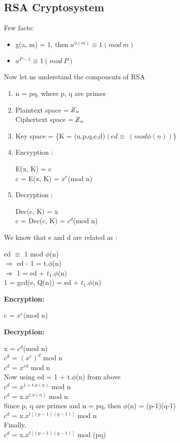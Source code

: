 \documentclass[11pt]{article}
\newcommand{\zbar}{\raisebox{0.2ex}{--}\kern-0.6em Z}
\begin{document}
\subsection{RSA Cryptosystem}
Few facts:
\begin{itemize}
    \item g(a, m) = 1, then $a^{\phi(m)} \equiv 1 (mod\ m)$
    \item $a^{P-1} \equiv 1 (mod \ P)$
\end{itemize}
Now let us understand the components of RSA
\begin{enumerate}
    \item n = pq, where p, q are primes
    \item Plaintext space =  ${\zbar}_n$\\
    Ciphertext space = ${\zbar}_n$\\
    \item Key space = \{K = (n,p,q,e,d) $|\ ed \equiv\ (mod \phi(n))$\}
    \item Encryption : \\
    \begin{center}
        E(x, K) = c\\
        c = E(x, K) = $x^e$(mod n)
    \end{center}
    \item Decryption :\\
    \begin{center}
        Dec(c, K) = x\\
        c = Dec(c, K) = $c^d$(mod n)
    \end{center}
\end{enumerate}
We know that e and d are related as :
\begin{center}
    ed $\equiv$ 1 mod $\phi$(n)\\
    $\Rightarrow$ ed - 1 = t.$\phi$(n)\\
    $\Rightarrow$ 1 = ed + $t_1$.$\phi$(n)\\
    1 = gcd(e, Q(n)) = ed + $t_1$.$\phi$(n)
\end{center}
\textbf{Encryption:}\\
\begin{center}
    c = $x^e$(mod n)
\end{center}
\textbf{Decryption:}\\
\begin{center}
    x = $c^d$(mod n)\\
    $c^d$ = ${(x^e)}^d$ mod n\\
    $c^d$ = $x^{ed}$ mod n\\
    Now using ed = 1 + t.$\phi$(n) from above\\
    $c^d$ = $x^{1+t.\phi(n)}$ mod n\\
    $c^d$ = x.$x^{t.\phi(n)}$ mod n\\
    Since p, q are primes and n = pq, then $\phi$(n) = (p-1)(q-1)\\
    $c^d$ = x.$x^{t[(p-1)(q-1)]}$ mod n\\
    Finally,\\
    $c^d$ = x.$x^{t[(p-1)(q-1)]}$ mod (pq)\\
\end{center}
\end{document}
